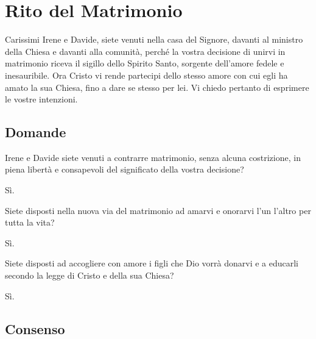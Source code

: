 
\section*{Rito del Matrimonio}

	\begin{dialoghi}
		\item[\sacerdote] Carissimi Irene e Davide, siete venuti nella casa del Signore, davanti al ministro della Chiesa e davanti alla comunità, perché la vostra decisione di unirvi in matrimonio riceva il sigillo dello Spirito Santo, sorgente dell'amore fedele e inesauribile. Ora Cristo vi rende partecipi dello stesso amore con cui egli ha amato la sua Chiesa, fino a dare se stesso per lei. Vi chiedo pertanto di esprimere le vostre intenzioni.
	\end{dialoghi}

\subsection*{Domande}

	\begin{dialoghi}
		\item[\sacerdote] Irene e Davide siete venuti a contrarre matrimonio, senza alcuna costrizione, in piena libertà e consapevoli del significato della vostra decisione?
		\item[\sposi] Sì.
		\item[\sacerdote] Siete disposti nella nuova via del matrimonio ad amarvi e onorarvi l'un l'altro per tutta la vita?
		\item[\sposi] Sì.
		\item[\sacerdote] Siete disposti ad accogliere con amore i figli che Dio vorrà donarvi e a educarli secondo la legge di Cristo e della sua Chiesa?
		\item[\sposi] Sì.
	\end{dialoghi}

\subsection*{Consenso}

